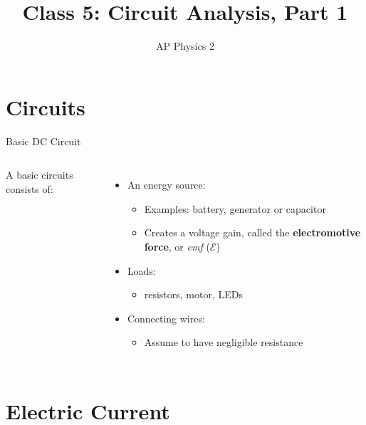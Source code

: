 \documentclass[12pt,aspectratio=169]{beamer}
\title{Class 5: Circuit Analysis, Part 1}
\subtitle{AP Physics 2}
\begin{document}
\begin{frame}
  \maketitle
\end{frame}


\section{Circuits}

\begin{frame}{Basic DC Circuit}
  \begin{columns}
    \centering
    
    A basic circuits consists of:
    \begin{itemize}
    \item An energy source:
      \begin{itemize}
      \item Examples: battery, generator or capacitor
      \item Creates a voltage gain, called the \textbf{electromotive force}, or
        \emph{emf} ($\mathcal E$)
      \end{itemize}
    \item Loads:
      \begin{itemize}
        \item resistors, motor, LEDs
      \end{itemize}
    \item Connecting wires:
      \begin{itemize}
      \item Assume to have negligible resistance
      \end{itemize}
    \end{itemize}
  \end{columns}
\end{frame}



\section{Electric Current}
\end{document}
